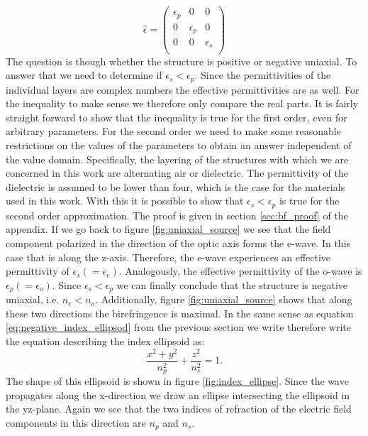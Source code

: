 \begin{equation}
    \hat{\epsilon} = 
    \begin{pmatrix}
        \epsilon_{p} & 0 & 0 \\
        0 & \epsilon_{p} & 0 \\
        0 & 0 & \epsilon_{s} \\
    \end{pmatrix}
\end{equation}
The question is though whether the structure is positive or negative uniaxial. To answer that we need to determine if $\epsilon_{s} < \epsilon_{p}$. Since the permittivities of the individual layers are complex numbers the effective permittivities are as well. For the inequality to make sense we therefore only compare the real parts. It is fairly straight forward to show that the inequality is true for the first order, even for arbitrary parameters. For the second order we need to make some reasonable restrictions on the values of the parameters to obtain an answer independent of the value domain. Specifically, the layering of the structures with which we are concerned in this work are alternating air or dielectric. The permittivity of the dielectric is assumed to be lower than four, which is the case for the materials used in this work. With this it is possible to show that $\epsilon_{s} < \epsilon_{p}$ is true for the second order approximation. The proof is given in section \ref{sec:bf_proof} of the appendix. If we go back to figure \ref{fig:uniaxial_source} we see that the field component polarized in the direction of the optic axis forms the e-wave. In this case that is along the z-axis. Therefore, the e-wave experiences an effective permittivity of $\epsilon_{s}(=\epsilon_{e})$. Analogously, the effective permittivity of the o-wave is $\epsilon_{p}(=\epsilon_{o})$. Since $\epsilon_{s} < \epsilon_{p}$ we can finally conclude that the structure is negative uniaxial, i.e. $n_e < n_o$. Additionally, figure \ref{fig:uniaxial_source} shows that along these two directions the birefringence is maximal. 
In the same sense as equation \ref{eq:negative_index_ellipsod} from the previous section we write therefore write the equation describing the index ellipsoid as:
\begin{equation}
    \frac{x^2+y^2}{n_p^2}+\frac{z^2}{n_s^2}=1.
\end{equation}
The shape of this ellipsoid is shown in figure \ref{fig:index_ellipse}. Since the wave propagates along the x-direction we draw an ellipse intersecting the ellipsoid in the yz-plane. Again we see that the two indices of refraction of the electric field components in this direction are $n_{p}$ and $n_{s}$. 
